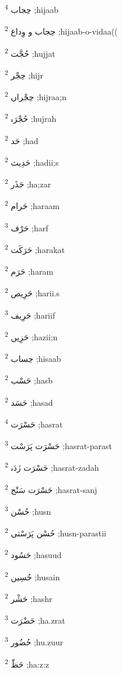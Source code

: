 \documentclass[12pt]{article}
\begin{document}
\begin{multicols}{5}
{\ur حِجاب}   \textsuperscript{4} ;hijaab

{\ur حِجاب و وِداع}   \textsuperscript{2} ;hijaab-o-vidaa((

{\ur حُجَّت}   \textsuperscript{2} ;hujjat

{\ur حِجْر}   \textsuperscript{2} ;hijr

{\ur حِجْراں}   \textsuperscript{2} ;hijraa;n

{\ur حُجْرَہ}   \textsuperscript{2} ;hujrah

{\ur حَد}   \textsuperscript{2} ;had

{\ur حَدِیث}   \textsuperscript{2} ;hadii;s

{\ur حَذَر}   \textsuperscript{2} ;ha;zar

{\ur حَرام}   \textsuperscript{2} ;haraam

{\ur حَرْف}   \textsuperscript{3} ;harf

{\ur حَرَکَت}   \textsuperscript{2} ;harakat

{\ur حَرَم}   \textsuperscript{2} ;haram

{\ur حَرِیص}   \textsuperscript{2} ;harii.s

{\ur حَرِیف}   \textsuperscript{3} ;hariif

{\ur حَزِیں}   \textsuperscript{2} ;hazii;n

{\ur حِساب}   \textsuperscript{2} ;hisaab

{\ur حَسْب}   \textsuperscript{2} ;hasb

{\ur حَسَد}   \textsuperscript{2} ;hasad

{\ur حَسْرَت}   \textsuperscript{4} ;hasrat

{\ur حَسْرَت پَرَسْت}   \textsuperscript{3} ;hasrat-parast

{\ur حَسْرَت زَدَہ}   \textsuperscript{2} ;hasrat-zadah

{\ur حَسْرَت سَنْج}   \textsuperscript{2} ;hasrat-sanj

{\ur حُسْن}   \textsuperscript{3} ;husn

{\ur حُسْن پَرَسْتی}   \textsuperscript{2} ;husn-parastii

{\ur حَسُود}   \textsuperscript{2} ;hasuud

{\ur حُسِین}   \textsuperscript{2} ;husain

{\ur حَشْر}   \textsuperscript{2} ;hashr

{\ur حَضْرَت}   \textsuperscript{3} ;ha.zrat

{\ur حُضُور}   \textsuperscript{3} ;hu.zuur

{\ur حَظّ}   \textsuperscript{2} ;ha:z:z


\end{multicols}
\end{document}
